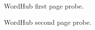 \documentclass{article}
\begin{document}
\noindent WordHub first page probe.\par

\newpage
\noindent WordHub second page probe.\par
\end{document}
